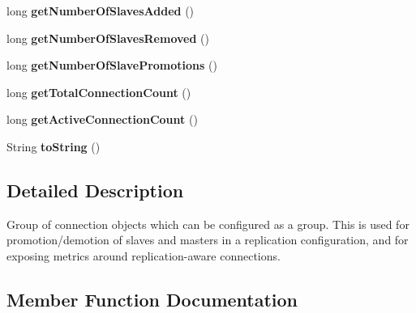 \begin{DoxyCompactItemize}
\mbox{\label{classcom_1_1mysql_1_1cj_1_1jdbc_1_1ha_1_1_replication_connection_group_aa2e94384131bb462e1f584f47236021e}} 
long {\bfseries get\+Number\+Of\+Slaves\+Added} ()
\item 
\mbox{\label{classcom_1_1mysql_1_1cj_1_1jdbc_1_1ha_1_1_replication_connection_group_a9da050e4008ba4c847cb1942e7f5cca5}} 
long {\bfseries get\+Number\+Of\+Slaves\+Removed} ()
\item 
\mbox{\label{classcom_1_1mysql_1_1cj_1_1jdbc_1_1ha_1_1_replication_connection_group_a831e025a67948ae07cbb2c1d8069dc64}} 
long {\bfseries get\+Number\+Of\+Slave\+Promotions} ()
\item 
\mbox{\label{classcom_1_1mysql_1_1cj_1_1jdbc_1_1ha_1_1_replication_connection_group_a41e58a0d89cfb66483e04def035144ff}} 
long {\bfseries get\+Total\+Connection\+Count} ()
\item 
\mbox{\label{classcom_1_1mysql_1_1cj_1_1jdbc_1_1ha_1_1_replication_connection_group_a0688494ae0d8db6dade2ab0012c32c8b}} 
long {\bfseries get\+Active\+Connection\+Count} ()
\item 
\mbox{\label{classcom_1_1mysql_1_1cj_1_1jdbc_1_1ha_1_1_replication_connection_group_a3acb730154c5ca1be9bef539ac44d4ed}} 
String {\bfseries to\+String} ()
\end{DoxyCompactItemize}


\subsection{Detailed Description}
Group of connection objects which can be configured as a group. This is used for promotion/demotion of slaves and masters in a replication configuration, and for exposing metrics around replication-\/aware connections. 

\subsection{Member Function Documentation}
\mbox{\label{classcom_1_1mysql_1_1cj_1_1jdbc_1_1ha_1_1_replication_connection_group_af6b5ef78b532f8eb4cf0529d482076f3}} 
